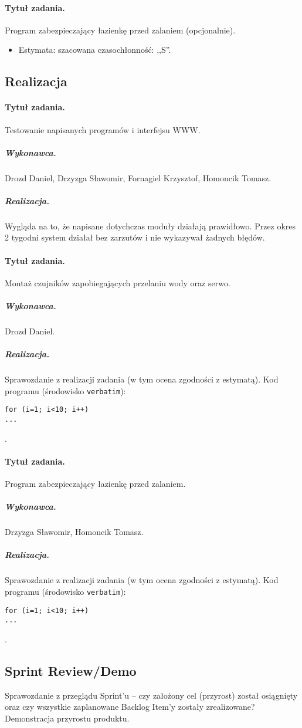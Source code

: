 \paragraph{Tytuł zadania.} Program zabezpieczający łazienkę przed zalaniem (opcjonalnie).
\begin{itemize}
	\item Estymata: szacowana czasochłonność: ,,S''.
\end{itemize}


\subsection{Realizacja}

\paragraph{Tytuł zadania.} Testowanie napisanych programów i interfejsu WWW.
\subparagraph{Wykonawca.} Drozd Daniel, Drzyzga Sławomir, Fornagiel Krzysztof, Homoncik Tomasz.
\subparagraph{Realizacja.}
Wygląda na to, że napisane dotychczas moduły działają prawidłowo. Przez okres 2 tygodni system działał bez zarzutów i nie wykazywał żadnych błędów.

\paragraph{Tytuł zadania.} Montaż czujników zapobiegających przelaniu wody oraz serwo.
\subparagraph{Wykonawca.} Drozd Daniel.
\subparagraph{Realizacja.} Sprawozdanie z realizacji zadania (w tym ocena zgodności z estymatą). Kod programu (środowisko \texttt{verbatim}): \begin{verbatim}
for (i=1; i<10; i++)
...
\end{verbatim}.

\paragraph{Tytuł zadania.} Program zabezpieczający łazienkę przed zalaniem.
\subparagraph{Wykonawca.} Drzyzga Sławomir, Homoncik Tomasz.
\subparagraph{Realizacja.} Sprawozdanie z realizacji zadania (w tym ocena zgodności z estymatą). Kod programu (środowisko \texttt{verbatim}): \begin{verbatim}
for (i=1; i<10; i++)
...
\end{verbatim}.


\subsection{Sprint Review/Demo}
Sprawozdanie z przeglądu Sprint'u -- czy założony cel (przyrost) został osiągnięty oraz czy wszystkie zaplanowane Backlog Item'y zostały zrealizowane? Demonstracja przyrostu produktu.
